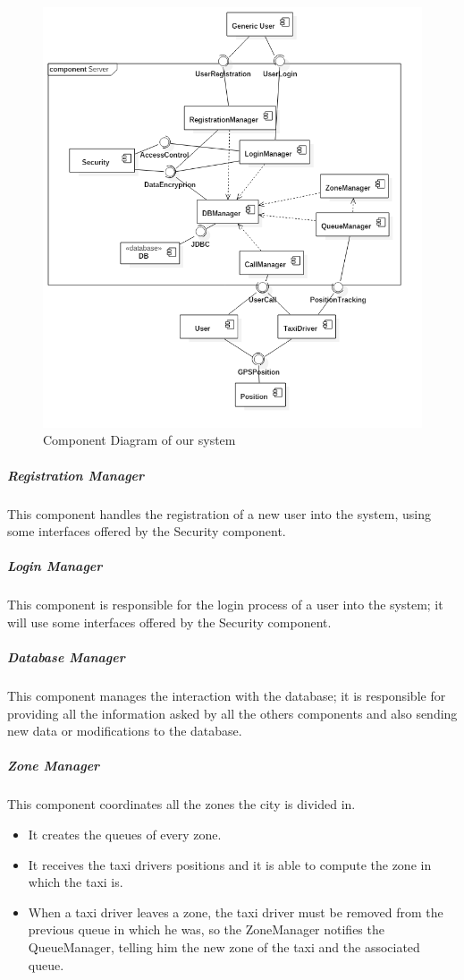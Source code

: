 \begin{figure}[H]
    \centering
    \includegraphics[width=14cm]{./Images/ComponentDiagram.png}
    \caption{Component Diagram of our system}
    \label{fig:component-diagram}
\end{figure}


\subparagraph{Registration Manager}
This component handles the registration of a new user into the system, using some interfaces offered by the Security component.

\subparagraph{Login Manager}
This component is responsible for the login process of a user into the system; it will use some interfaces offered by the Security component.

\subparagraph{Database Manager}
This component manages the interaction with the database; it is responsible for providing all the information asked by all the others components and also sending new data or modifications to the database.

\subparagraph{Zone Manager}
This component coordinates all the zones the city is divided in.
\begin{itemize}
    \item It creates the queues of every zone.
    \item It receives the taxi drivers positions and it is able to compute the zone in which the taxi is.
    \item When a taxi driver leaves a zone, the taxi driver must be removed from the previous queue in which he was, so the ZoneManager notifies the QueueManager, telling him the new zone of the taxi and the associated queue.
\end{itemize}

